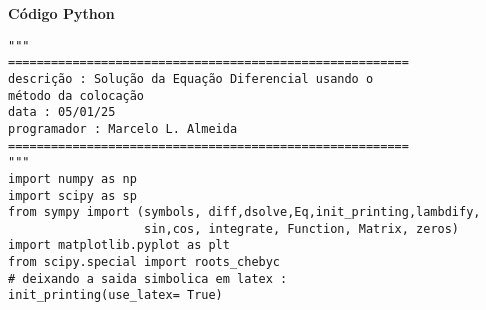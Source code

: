 \documentclass[a4paper, 12pt]{article}
\numberwithin{equation}{section}
\begin{document}


\vspace{0.5cm}

{\textbf{\large Código Python}}



\begin{lstlisting}
"""
========================================================
descrição : Solução da Equação Diferencial usando o 
método da colocação
data : 05/01/25
programador : Marcelo L. Almeida 
========================================================
"""
import numpy as np 
import scipy as sp 
from sympy import (symbols, diff,dsolve,Eq,init_printing,lambdify,
                   sin,cos, integrate, Function, Matrix, zeros)
import matplotlib.pyplot as plt 
from scipy.special import roots_chebyc
# deixando a saida simbolica em latex : 
init_printing(use_latex= True)
\end{lstlisting}
\end{document}
